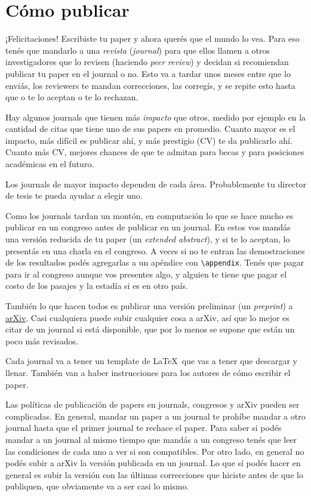 \documentclass{article}
\begin{document}
\section{Cómo publicar}
\label{sec:publicar}

¡Felicitaciones! Escribiste tu paper y ahora querés que el mundo lo vea. Para eso tenés que mandarlo a una \emph{revista} (\emph{journal}) para que ellos llamen a otros investigadores que lo revisen (haciendo \emph{peer review}) y decidan si recomiendan publicar tu paper en el journal o no. Esto va a tardar unos meses entre que lo enviás, los reviewers te mandan correcciones, las corregís, y se repite esto hasta que o te lo aceptan o te lo rechazan.

Hay algunos journals que tienen más \emph{impacto} que otros, medido por ejemplo en la cantidad de citas que tiene uno de sus papers en promedio. Cuanto mayor es el impacto, más difícil es publicar ahí, y más prestigio (CV) te da publicarlo ahí. Cuanto más CV, mejores chances de que te admitan para becas y para posiciones académicas en el futuro.

Los journals de mayor impacto dependen de cada área. Probablemente tu director de tesis te pueda ayudar a elegir uno.

Como los journals tardan un montón, en computación lo que se hace mucho es publicar en un congreso antes de publicar en un journal. En estos vos mandás una versión reducida de tu paper (un \emph{extended abstract}), y si te lo aceptan, lo presentás en una charla en el congreso. A veces si no te entran las demostraciones de los resultados podés agregarlas a un apéndice con \verb|\appendix|. Tenés que pagar para ir al congreso aunque vos presentes algo, y alguien te tiene que pagar el costo de los pasajes y la estadía si es en otro país.

También lo que hacen todos es publicar una versión preliminar (un \emph{preprint}) a \href{https://arxiv.org/}{arXiv}. Casi cualquiera puede subir cualquier cosa a arXiv, así que lo mejor es citar de un journal si está disponible, que por lo menos se supone que están un poco más revisados.

Cada journal va a tener un template de \LaTeX\ que vas a tener que descargar y llenar. También van a haber instrucciones para los autores de cómo escribir el paper.

Las políticas de publicación de papers en journals, congresos y arXiv pueden ser complicadas. En general, mandar un paper a un journal te prohíbe mandar a otro journal hasta que el primer journal te rechace el paper. Para saber si podés mandar a un journal al mismo tiempo que mandás a un congreso tenés que leer las condiciones de cada uno a ver si son compatibles. Por otro lado, en general no podés subir a arXiv la versión publicada en un journal. Lo que sí podés hacer en general es subir la versión con las últimas correcciones que hiciste antes de que lo publiquen, que obviamente va a ser casi lo mismo.
\end{document}
